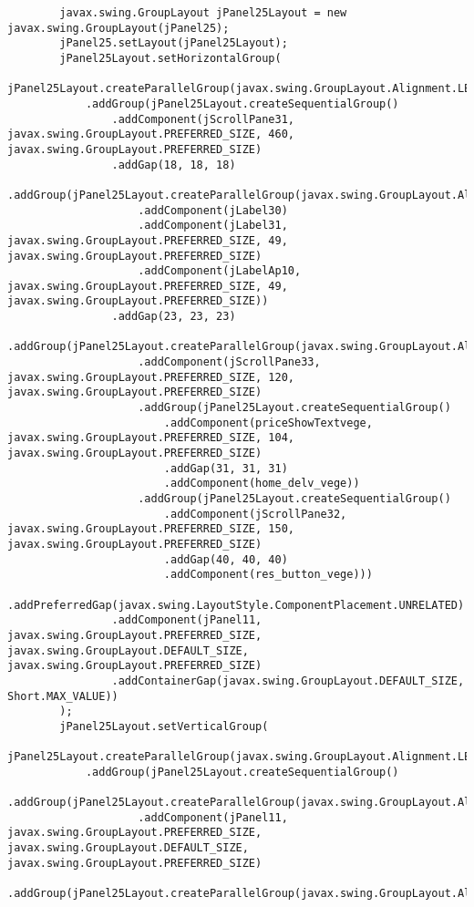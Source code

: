 \documentclass[12pt,a4paper]{article}
\begin{document}
\begin{lstlisting}
        javax.swing.GroupLayout jPanel25Layout = new javax.swing.GroupLayout(jPanel25);
        jPanel25.setLayout(jPanel25Layout);
        jPanel25Layout.setHorizontalGroup(
            jPanel25Layout.createParallelGroup(javax.swing.GroupLayout.Alignment.LEADING)
            .addGroup(jPanel25Layout.createSequentialGroup()
                .addComponent(jScrollPane31, javax.swing.GroupLayout.PREFERRED_SIZE, 460, javax.swing.GroupLayout.PREFERRED_SIZE)
                .addGap(18, 18, 18)
                .addGroup(jPanel25Layout.createParallelGroup(javax.swing.GroupLayout.Alignment.LEADING)
                    .addComponent(jLabel30)
                    .addComponent(jLabel31, javax.swing.GroupLayout.PREFERRED_SIZE, 49, javax.swing.GroupLayout.PREFERRED_SIZE)
                    .addComponent(jLabelAp10, javax.swing.GroupLayout.PREFERRED_SIZE, 49, javax.swing.GroupLayout.PREFERRED_SIZE))
                .addGap(23, 23, 23)
                .addGroup(jPanel25Layout.createParallelGroup(javax.swing.GroupLayout.Alignment.LEADING)
                    .addComponent(jScrollPane33, javax.swing.GroupLayout.PREFERRED_SIZE, 120, javax.swing.GroupLayout.PREFERRED_SIZE)
                    .addGroup(jPanel25Layout.createSequentialGroup()
                        .addComponent(priceShowTextvege, javax.swing.GroupLayout.PREFERRED_SIZE, 104, javax.swing.GroupLayout.PREFERRED_SIZE)
                        .addGap(31, 31, 31)
                        .addComponent(home_delv_vege))
                    .addGroup(jPanel25Layout.createSequentialGroup()
                        .addComponent(jScrollPane32, javax.swing.GroupLayout.PREFERRED_SIZE, 150, javax.swing.GroupLayout.PREFERRED_SIZE)
                        .addGap(40, 40, 40)
                        .addComponent(res_button_vege)))
                .addPreferredGap(javax.swing.LayoutStyle.ComponentPlacement.UNRELATED)
                .addComponent(jPanel11, javax.swing.GroupLayout.PREFERRED_SIZE, javax.swing.GroupLayout.DEFAULT_SIZE, javax.swing.GroupLayout.PREFERRED_SIZE)
                .addContainerGap(javax.swing.GroupLayout.DEFAULT_SIZE, Short.MAX_VALUE))
        );
        jPanel25Layout.setVerticalGroup(
            jPanel25Layout.createParallelGroup(javax.swing.GroupLayout.Alignment.LEADING)
            .addGroup(jPanel25Layout.createSequentialGroup()
                .addGroup(jPanel25Layout.createParallelGroup(javax.swing.GroupLayout.Alignment.TRAILING)
                    .addComponent(jPanel11, javax.swing.GroupLayout.PREFERRED_SIZE, javax.swing.GroupLayout.DEFAULT_SIZE, javax.swing.GroupLayout.PREFERRED_SIZE)
                    .addGroup(jPanel25Layout.createParallelGroup(javax.swing.GroupLayout.Alignment.LEADING)

\end{lstlisting}
\end{document}
